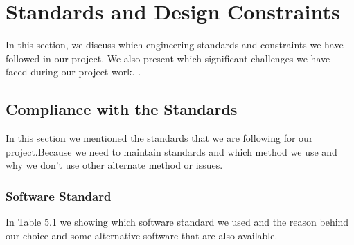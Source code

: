 \chapter{Standards and Design Constraints}
\label{std_des}
In this section, we discuss which engineering standards and constraints we have followed in our project. We also present which significant challenges we have faced during our project work. . 
\section{Compliance with the Standards}
In this section we mentioned the standards that we are following for our project.Because we need to maintain standards and which method we use and why we don't use other alternate method or issues.

\subsection{Software Standard}
In Table 5.1 we showing which software standard we used and the reason behind our choice and some alternative software that are also available.

